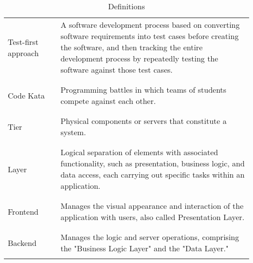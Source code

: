 \begin{table}[H]
\begin{tabular}{l l p{10cm}}
        Test-first approach & \vline & A software development process based on converting software requirements into test cases before creating the software,
                                       and then tracking the entire development process by repeatedly testing the software against those test cases.          \\
                            &        &                                                                                                                        \\\hline \\
        Code Kata           & \vline & Programming battles in which teams of students compete against each other.                                             \\
                            &        &                                                                                                                        \\\hline \\
        Tier                & \vline & Physical components or servers that constitute a system.                                                               \\
                            &        &                                                                                                                        \\\hline \\
        Layer               & \vline & Logical separation of elements with associated functionality, such as presentation, business logic, and data access, 
                                       each carrying out specific tasks within an application.                                                                \\
                            &        &                                                                                                                        \\\hline \\
        Frontend            & \vline & Manages the visual appearance and interaction of the application with users, also called Presentation Layer.           \\
                            &        &                                                                                                                        \\\hline \\
        Backend             & \vline & Manages the logic and server operations, comprising the "Business Logic Layer" and the "Data Layer."                   \\
                            &        &                                                                                                                        \\
        \hline
    \end{tabular}
    \caption{Definitions}
\end{table}

